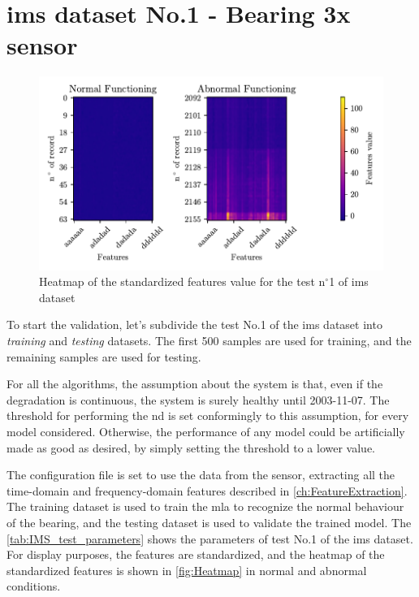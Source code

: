 \section{\gls{ims} dataset No.1 - Bearing 3x sensor}
\label{sec:ValidationOnRealWorldData}
\begin{figure}
    \centering
    \includegraphics{images/IMS/Heatmap.pdf}
    \caption{Heatmap of the standardized features value for the test $\text{n}^\circ$1 of \gls{ims} dataset}
    \label{fig:Heatmap}
\end{figure}


To start the validation, let's subdivide the test No.1 of the \gls{ims} dataset into \emph{training} and \emph{testing} datasets. The first 500 samples are used for training, and the remaining samples are used for testing. 

For all the algorithms, the assumption about the system is that, even if the degradation is continuous, the system is surely healthy until 2003-11-07. The threshold for performing the \gls{nd} is set conformingly to this assumption, for every model considered. Otherwise, the performance of any model could be artificially made as good as desired, by simply setting the threshold to a lower value.

The configuration file is set to use the data from the  sensor, extracting all the time-domain and frequency-domain features described in \autoref{ch:FeatureExtraction}. The training dataset is used to train the \gls{mla} to recognize the normal behaviour of the bearing, and the testing dataset is used to validate the trained model. The \autoref{tab:IMS_test_parameters} shows the parameters of test No.1 of the \gls{ims} dataset. For display purposes, the features are standardized, and the heatmap of the standardized features is shown in \autoref{fig:Heatmap} in normal and abnormal conditions.

